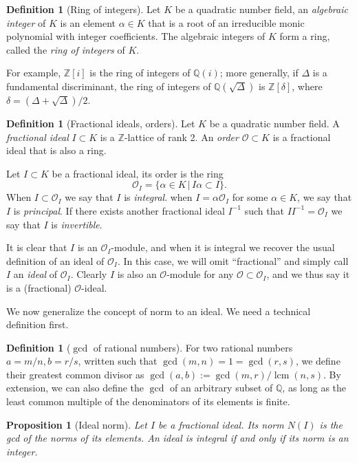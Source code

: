 \documentclass[10pt]{article}
\theoremstyle{plain}
\newtheorem{proposition}[theorem]{Proposition}
\theoremstyle{definition}
\newtheorem{definition}[theorem]{Definition}
\DeclareMathOperator{\lcm}{lcm} %
\def\Q{\ensuremath{\mathbb{Q}}}
\def\O{\ensuremath{\mathcal{O}}}
\begin{document}
\begin{definition}[Ring of integers]
  Let $K$ be a quadratic number field,
  an \emph{algebraic integer} of $K$ is an
  element $α∈K$ that is a root of an irreducible monic polynomial with
  integer coefficients. %
  The algebraic integers of $K$ form a ring, called the \emph{ring of
    integers} of $K$.
\end{definition}

For example, $ℤ[i]$ is the ring of integers of $ℚ(i)$; more generally,
if $Δ$ is a fundamental discriminant, the ring of integers of
$ℚ(\sqrt{Δ})$ is $ℤ[δ]$, where $δ=(Δ+\sqrt{Δ})/2$. %

\begin{definition}[Fractional ideals, orders]
  Let $K$ be a quadratic number field. %
  A \emph{fractional ideal} $I ⊂ K$ is a $ℤ$-lattice of rank 2. %
  An \emph{order} $\O ⊂ K$ is a fractional ideal that is also a ring.

  Let $I ⊂ K$ be a fractional ideal, its order is the ring
  \[\O_I = \{ α ∈ K \,|\, Iα ⊂ I \}.\]
  When $I ⊂ \O_I$ we say that $I$ is \emph{integral}. %
  when $I = α\O_I$ for some $α∈K$, we say that $I$ is
  \emph{principal}. %
  If there exists another fractional ideal $I^{-1}$ such that
  $II^{-1} = \O_I$ we say that $I$ is \emph{invertible}.
\end{definition}  

It is clear that $I$ is an $\O_I$-module, and when it is integral we
recover the usual definition of an ideal of $\O_I$. %
In this case, we will omit ``fractional'' and simply call $I$ an
\emph{ideal} of $\O_I$. %
Clearly $I$ is also an $\O$-module for any $\O⊂\O_I$, and we thus say
it is a (fractional) $\O$-ideal. %

We now generalize the concept of norm to an ideal. %
We need a technical definition first.

\begin{definition}[$\gcd$ of rational numbers]
  For two rational numbers $a=m/n,b=r/s$, written such that
  $\gcd(m,n)=1=\gcd(r,s)$, we define their greatest common divisor as
  $\gcd(a,b) := \gcd(m,r)/\lcm(n,s)$.  By extension, we can also
  define the $\gcd$ of an arbitrary subset of $\Q$, as long as the
  least common multiple of the denominators of its elements is finite.
\end{definition}

\begin{proposition}[Ideal norm]
  Let $I$ be a fractional ideal. %
  Its \emph{norm} $N(I)$ is the gcd of the norms of its elements. %
  An ideal is integral if and only if its norm is an integer.
\end{proposition}
\end{document}
